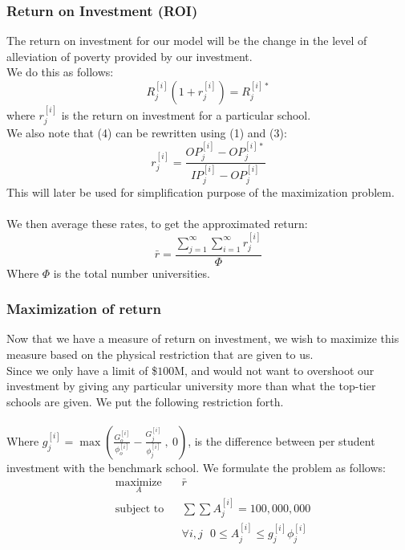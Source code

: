 \documentclass[12pt]{scrartcl}
\begin{document}
	\subsubsection{Return on Investment (ROI)}
		The return on investment for our model will be the change in the level of alleviation of poverty provided by our investment.\\
		We do this as follows:
		\begin{equation}
			R_j^{[i]}(1+r_j^{[i]}) = R_j^{[i]*}
		\end{equation}
		where $r_j^{[i]}$ is the return on investment for a particular school.\\
		We also note that (4) can be rewritten using (1) and (3):
		\begin{equation}
			r_j^{[i]} = \frac{ OP_j^{[i]} - OP_j^{[i]*}  }{ IP_j^{[i]} - OP_j^{[i]}  }
		\end{equation}	
	 	This will later be used for simplification purpose of the maximization problem.\\
		\\
		We then average these rates, to get the approximated return:
		\begin{equation}
			\bar{r} = \frac{ \sum_{j=1}^\infty\sum_{i=1}^\infty r_j^{[i]}  }{ \Phi }
		\end{equation}
		Where $\Phi$ is the total number universities.
		

	\subsubsection{Maximization of return}
		Now that we have a measure of return on investment, we wish to maximize this measure based on the physical restriction that are given to us.\\
		Since we only have a limit of \$$100$M, and would not want to overshoot our investment by giving any particular university more than what the top-tier schools are given. We put the following restriction forth.\\
		\\
		Where $g_j^{[i]} = \max( \frac{  G_o^{[i]}  }{  \phi_o^{[i]} } - \frac{  G_j^{[i]}  }{  \phi_j^{[i]} } \ ,\ 0 )$, is the difference between per student investment with the benchmark school. We formulate the problem as follows:
		\begin{equation}
				\begin{aligned}
					& \underset{A}{\text{maximize}}
					& &\bar{r}\\
					& \text{subject to}
					& & \sum \sum A_j^{[i]} = 100,000,000 \\
					&&& \forall i,j \ \ \ 0\le A_j^{[i]} \le g_j^{[i]}\phi_j^{[i]}
				\end{aligned}
		\end{equation}
\end{document}
